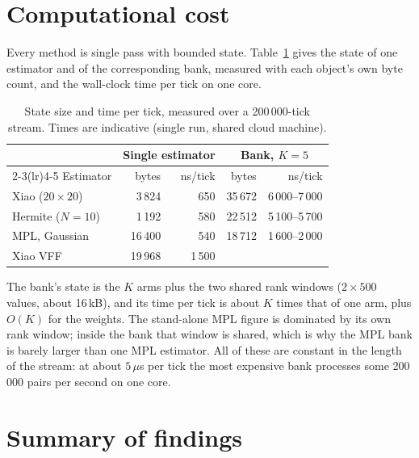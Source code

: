 \section{Computational cost}
\label{sec:cost}

Every method is single pass with bounded state. Table~\ref{tab:cost} gives the state of one
estimator and of the corresponding bank, measured with each object's own byte count, and the
wall-clock time per tick on one core.

\begin{table}[ht]
  \centering
  \caption{State size and time per tick, measured over a 200\,000-tick stream. Times are
    indicative (single run, shared cloud machine).}
  \label{tab:cost}
  \begin{tabular}{lrrrr}
    \toprule
    & \multicolumn{2}{c}{Single estimator} & \multicolumn{2}{c}{Bank, $K=5$} \\
    \cmidrule(lr){2-3}\cmidrule(lr){4-5}
    Estimator & bytes & ns/tick & bytes & ns/tick \\
    \midrule
    Xiao ($20\times20$)  & 3\,824  & 650 & 35\,672 & 6\,000--7\,000 \\
    Hermite ($N=10$)     & 1\,192  & 580 & 22\,512 & 5\,100--5\,700 \\
    MPL, Gaussian        & 16\,400 & 540 & 18\,712 & 1\,600--2\,000 \\
    Xiao VFF             & 19\,968 & 1\,500 & & \\
    \bottomrule
  \end{tabular}
\end{table}

The bank's state is the $K$ arms plus the two shared rank windows ($2\times500$ values, about
16\,kB), and its time per tick is about $K$ times that of one arm, plus $O(K)$ for the weights. The
stand-alone MPL figure is dominated by its own rank window; inside the bank that window is shared,
which is why the MPL bank is barely larger than one MPL estimator. All of these are constant in the
length of the stream: at about $5\,\mu$s per tick the most expensive bank processes some 200\,000
pairs per second on one core.

\section{Summary of findings}
\label{sec:summary}

